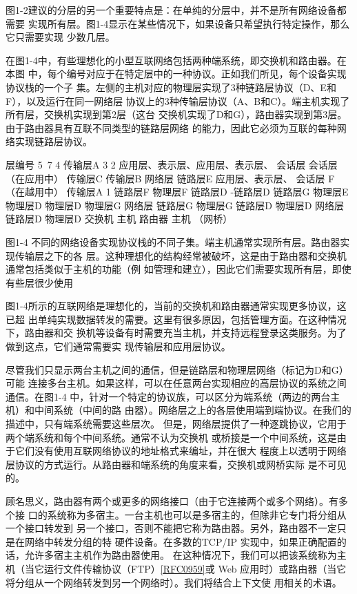 图1-2建议的分层的另一个重要特点是：在单纯的分层中，并不是所有网络设备都需要
实现所有层。图1-4显示在某些情况下，如果设备只希望执行特定操作，那么它只需要实现
少数几层。

在图1-4中，有些理想化的小型互联网络包括两种端系统，即交换机和路由器。在本图
中，每个编号对应于在特定层中的一种协议。正如我们所见，每个设备实现协议栈的一个子
集。左侧的主机对应的物理层实现了3种链路层协议（D、E和F），以及运行在同一网络层
协议上的3种传输层协议（A、B和C）。端主机实现了所有层，交换机实现到第2层（这台
交换机实现了D和G），路由器实现到第3层。由于路由器具有互联不同类型的链路层网络
的能力，因此它必须为互联的每种网络实现链路层协议。

层编号
5~7
4
传输层A
3
2
应用层、表示层、应用层、表示层、
会话层
会话层
（在应用中）
传输层C
传输层B
网络层
链路层E
应用层、表示层、
会话层
F（在越用中）
传输层A
1
链路层F
物理层F
链路层D
-链路层D
链路层G
物理层E
物理层D
物理层D
物理层G
网络层
链路层G
物理层G
链路层D
物理层D
网络层
链路层D
物理层D
交换机
主机
路由器
主机
（网桥）

图1-4 不同的网络设备实现协议栈的不同子集。端主机通常实现所有层。路由器实现传输层之下的各
层。这种理想化的结构经常被破坏，这是由于路由器和交换机通常包括类似于主机的功能（例
如管理和建立），因此它们需要实现所有层，即使有些层很少使用

图1-4所示的互联网络是理想化的，当前的交换机和路由器通常实现更多协议，这已超
出单纯实现数据转发的需要。这里有很多原因，包括管理方面。在这种情况下，路由器和交
换机等设备有时需要充当主机，并支持远程登录这类服务。为了做到这点，它们通常需要实
现传输层和应用层协议。

尽管我们只显示两台主机之间的通信，但是链路层和物理层网络（标记为D和G）可能
连接多台主机。如果这样，可以在任意两台实现相应的高层协议的系统之间通信。在图1-4
中，针对一个特定的协议族，可以区分为端系统（两边的两台主机）和中间系统（中间的路
由器）。网络层之上的各层使用端到端协议。在我们的描述中，只有端系统需要这些层次。
但是，网络层提供了一种逐跳协议，它用于两个端系统和每个中间系统。通常不认为交换机
或桥接是一个中间系统，这是由于它们没有使用互联网络协议的地址格式来编址，并在很大
程度上以透明于网络层协议的方式运行。从路由器和端系统的角度来看，交换机或网桥实际
是不可见的。

顾名思义，路由器有两个或更多的网络接口（由于它连接两个或多个网络）。有多个接
口的系统称为多宿主。一台主机也可以是多宿主的，但除非它专门将分组从一个接口转发到
另一个接口，否则不能把它称为路由器。另外，路由器不一定只是在网络中转发分组的特
硬件设备。在多数的TCP/IP 实现中，如果正确配置的话，允许多宿主主机作为路由器使用。
在这种情况下，我们可以把该系统称为主机（当它运行文件传输协议（FTP）\href{https://www.rfc-editor.org/rfc/rfc0959}{[RFC0959]}或
Web 应用时）或路由器（当它将分组从一个网络转发到另一个网络时）。我们将结合上下文使
用相关的术语。

